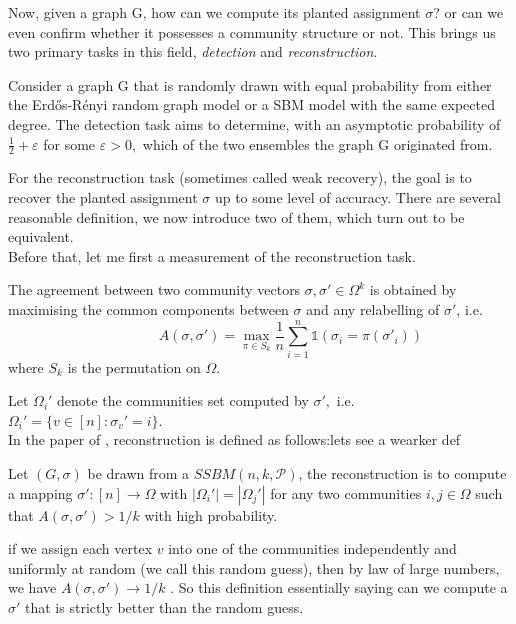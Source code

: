 Now, given a graph G, how can we compute its planted assignment $\sigma$? or  can we even confirm whether it possesses a community structure or not. This brings us two primary tasks in this field, \textit{detection} and \textit{reconstruction}.
\begin{definition}[Detection]
    Consider a graph G that is randomly drawn with equal probability from either the Erd\H{o}s-R\'{e}nyi random graph model or a SBM model with the same expected degree. The detection task aims to determine, with an asymptotic probability of $\frac{1}{2}+\varepsilon$ for some $\varepsilon > 0,$ which of the two ensembles the graph G originated from.
\end{definition}
For the reconstruction task (sometimes called weak recovery), the goal is to recover the planted assignment $\sigma$ up to some level of accuracy. There are several reasonable definition, we now introduce two of them, which turn out to be equivalent.\\
Before that, let me first a measurement of the reconstruction task.
\begin{definition}[Agreement]
The agreement between two community vectors $\sigma, \sigma'\in\Omega^k$ is obtained by maximising the common components between $\sigma$ and any relabelling of $\sigma'$, i.e.\begin{equation}
    ~~~~~~~~~~~~~~~~~~~~A(\sigma, \sigma')=\max_{\pi \in S_k} \frac{1}{n} \sum_{i=1}^{n} \mathbb{1}(\sigma_i = \pi(\sigma'_i))
\end{equation}
where $S_k$ is the permutation on $\Omega$.
\end{definition}
Let $\Omega_i'$ denote the communities set computed by $\sigma',$ i.e. $\Omega_i'=\{v\in[n]: \sigma_v'=i\}.$\\
In the paper of \cite{TheSurvey} \cite{refpurpose}, reconstruction is defined as follows:\textcolor{Mahogany}{lets see a wearker def}
\begin{definition}[Reconstruction]\label{def: recover_1}
Let $(G, \sigma)$ be drawn from a $SSBM(n, k, \mathcal{P})$, the reconstruction is to compute a mapping $\sigma': [n]\rightarrow \Omega$ with $|\Omega_i'|=|\Omega_j'|$ for any two communities $i, j\in\Omega$   such that $A(\sigma, \sigma')> 1/k$ \textcolor{Mahogany}{with high probability.}
\end{definition}
\begin{remark}
    if we assign each vertex $v$ into one of the communities independently and uniformly at random (we call this random guess), then by law of large numbers, we have $A(\sigma, \sigma')\rightarrow 1/k$ \cite{TheSurvey}. So this definition essentially saying can we compute a $\sigma'$ that is strictly better than the random guess.
\end{remark}
